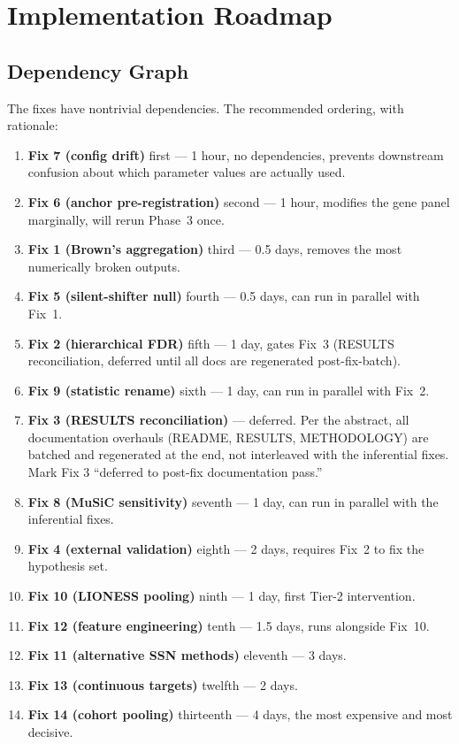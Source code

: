 \documentclass[11pt]{article}
\begin{document}
\clearpage

\section{Implementation Roadmap}
\label{sec:roadmap}

\subsection{Dependency Graph}

The fixes have nontrivial dependencies. The recommended ordering, with rationale:

\begin{enumerate}[leftmargin=*]
\item \textbf{Fix 7 (config drift)} first --- 1 hour, no dependencies, prevents downstream confusion about which parameter values are actually used.
\item \textbf{Fix 6 (anchor pre-registration)} second --- 1 hour, modifies the gene panel marginally, will rerun Phase~3 once.
\item \textbf{Fix 1 (Brown's aggregation)} third --- 0.5 days, removes the most numerically broken outputs.
\item \textbf{Fix 5 (silent-shifter null)} fourth --- 0.5 days, can run in parallel with Fix~1.
\item \textbf{Fix 2 (hierarchical FDR)} fifth --- 1 day, gates Fix~3 (RESULTS reconciliation, deferred until all docs are regenerated post-fix-batch).
\item \textbf{Fix 9 (statistic rename)} sixth --- 1 day, can run in parallel with Fix~2.
\item \textbf{Fix 3 (RESULTS reconciliation)} --- deferred. Per the abstract, all documentation overhauls (README, RESULTS, METHODOLOGY) are batched and regenerated at the end, not interleaved with the inferential fixes. Mark Fix 3 ``deferred to post-fix documentation pass.''
\item \textbf{Fix 8 (MuSiC sensitivity)} seventh --- 1 day, can run in parallel with the inferential fixes.
\item \textbf{Fix 4 (external validation)} eighth --- 2 days, requires Fix~2 to fix the hypothesis set.
\item \textbf{Fix 10 (LIONESS pooling)} ninth --- 1 day, first Tier-2 intervention.
\item \textbf{Fix 12 (feature engineering)} tenth --- 1.5 days, runs alongside Fix~10.
\item \textbf{Fix 11 (alternative SSN methods)} eleventh --- 3 days.
\item \textbf{Fix 13 (continuous targets)} twelfth --- 2 days.
\item \textbf{Fix 14 (cohort pooling)} thirteenth --- 4 days, the most expensive and most decisive.
\end{enumerate}
\end{document}
